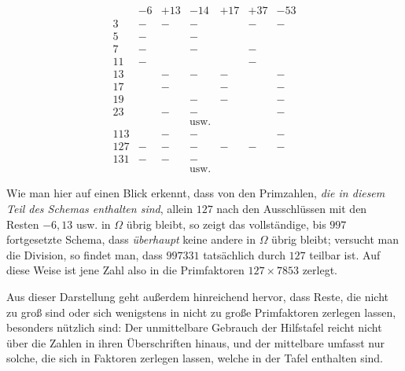 \[\renewcommand{\arraystretch}{1.05}\begin{array}{|r|c|c|c|c|c|c|}&-6&+13&-14&+17&+37&-53\\\hline 3&-&-&-&&-&-\\5&-&&-&&&\\7&-&&-&&-&\\11&-&&&&-&\\13&&-&-&-&&-\\17&&-&&-&&-\\19&&&-&-&&-\\23&&-&-&&&-\\&&&\text{usw.}&&&\\113&&-&-&&&-\\127&-&-&-&-&-&-\\131&-&-&-&&&\\&&&\text{usw.}&&&\end{array}\]

Wie man hier auf einen Blick erkennt, dass von den Primzahlen, \textit{die in diesem Teil des Schemas enthalten sind}, allein \(127\) nach den Ausschlüssen mit den Resten \(-6,\allowbreak 13\) usw. in \(\Omega\) übrig bleibt, so zeigt das vollständige, bis \(997\) fortgesetzte Schema, dass \textit{überhaupt} keine andere in \(\Omega\) übrig bleibt; versucht man die Division, so findet man, dass \(997331\) tatsächlich durch \(127\) teilbar ist. Auf diese Weise ist jene Zahl also in die Primfaktoren \(127\times7853\) zerlegt.

Aus dieser Darstellung geht außerdem hinreichend hervor, dass Reste, die nicht zu groß sind oder sich wenigstens in nicht zu große Primfaktoren zerlegen lassen, besonders nützlich sind: Der unmittelbare Gebrauch der Hilfstafel reicht nicht über die Zahlen in ihren Überschriften hinaus, und der mittelbare umfasst nur solche, die sich in Faktoren zerlegen lassen, welche in der Tafel enthalten sind.

